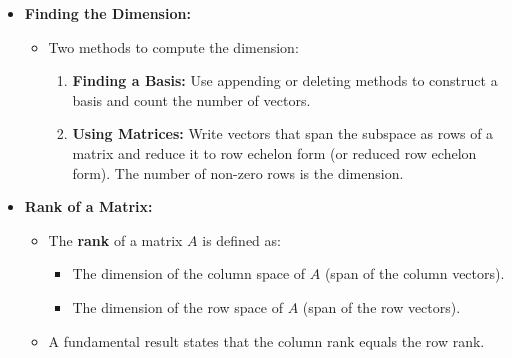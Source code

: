 \documentclass{article}
\begin{document}
\begin{itemize}
  \item \textbf{Finding the Dimension:}
    \begin{itemize}
      \item Two methods to compute the dimension:
        \begin{enumerate}
          \item \textbf{Finding a Basis:} Use appending or deleting methods to construct a basis and count the number of vectors.
          \item \textbf{Using Matrices:} Write vectors that span the subspace as rows of a matrix and reduce it to row echelon form (or reduced row echelon form). The number of non-zero rows is the dimension.
        \end{enumerate}
    \end{itemize}

  \item \textbf{Rank of a Matrix:}
    \begin{itemize}
      \item The \textbf{rank} of a matrix $A$ is defined as:
        \begin{itemize}
          \item The dimension of the column space of $A$ (span of the column vectors).
          \item The dimension of the row space of $A$ (span of the row vectors).
        \end{itemize}
      \item A fundamental result states that the column rank equals the row rank.
    \end{itemize}


\end{itemize}
\end{document}
